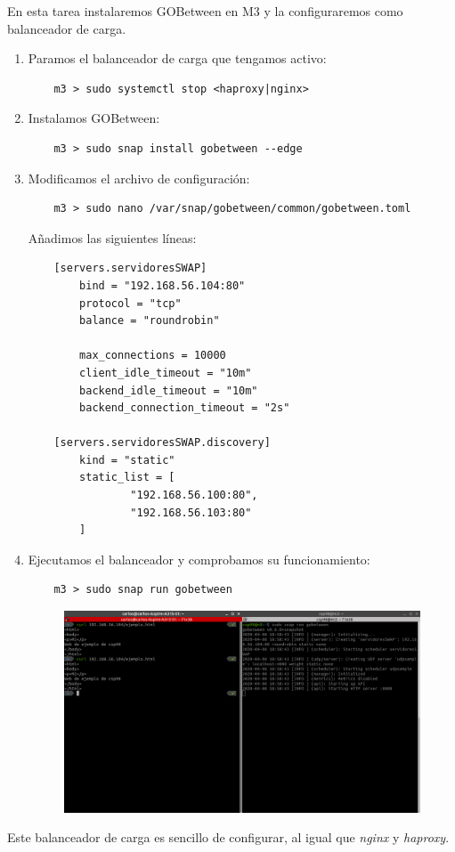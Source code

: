 \documentclass[12pt,spanish]{article}
\begin{document}
En esta tarea instalaremos GOBetween en M3 y la configuraremos como balanceador de carga.

\begin{enumerate}
	\item Paramos el balanceador de carga que tengamos activo:
	\begin{lstlisting}
	m3 > sudo systemctl stop <haproxy|nginx>
	\end{lstlisting}
	\item Instalamos GOBetween:
	\begin{lstlisting}
	m3 > sudo snap install gobetween --edge
	\end{lstlisting}
	\item Modificamos el archivo de configuración:
	\begin{lstlisting}
	m3 > sudo nano /var/snap/gobetween/common/gobetween.toml
	\end{lstlisting}
	Añadimos las siguientes líneas:
	\begin{lstlisting}
	[servers.servidoresSWAP]
		bind = "192.168.56.104:80"
		protocol = "tcp"
		balance = "roundrobin"

		max_connections = 10000
		client_idle_timeout = "10m"
		backend_idle_timeout = "10m"
		backend_connection_timeout = "2s"

	[servers.servidoresSWAP.discovery]
		kind = "static"
		static_list = [
		        "192.168.56.100:80",
		        "192.168.56.103:80"
		]
	\end{lstlisting}
	\item Ejecutamos el balanceador y comprobamos su funcionamiento:
	\begin{lstlisting}
	m3 > sudo snap run gobetween
	\end{lstlisting}
	\begin{figure}[H]
		\centering
		\includegraphics[scale=0.45]{t4-4/gobetween-ok.png}
	\end{figure}
\end{enumerate}

Este balanceador de carga es sencillo de configurar, al igual que \emph{nginx} y \emph{haproxy}.
\end{document}
